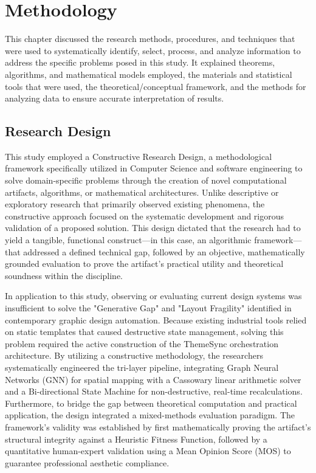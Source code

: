 
\chapter{Methodology}
\begin{refsection}
This chapter discussed the research methods, procedures, and techniques that were used to systematically identify, select, process, and analyze information to address the specific problems posed in this study. It explained theorems, algorithms, and mathematical models employed, the materials and statistical tools that were used, the theoretical/conceptual framework, and the methods for analyzing data to ensure accurate interpretation of results.


\section{Research Design}
This study employed a Constructive Research Design, a methodological framework specifically utilized in Computer Science and software engineering to solve domain-specific problems through the creation of novel computational artifacts, algorithms, or mathematical architectures. Unlike descriptive or exploratory research that primarily observed existing phenomena, the constructive approach focused on the systematic development and rigorous validation of a proposed solution. This design dictated that the research had to yield a tangible, functional construct—in this case, an algorithmic framework—that addressed a defined technical gap, followed by an objective, mathematically grounded evaluation to prove the artifact's practical utility and theoretical soundness within the discipline.

In application to this study, observing or evaluating current design systems was insufficient to solve the "Generative Gap" and "Layout Fragility" identified in contemporary graphic design automation. Because existing industrial tools relied on static templates that caused destructive state management, solving this problem required the active construction of the ThemeSync orchestration architecture. By utilizing a constructive methodology, the researchers systematically engineered the tri-layer pipeline, integrating Graph Neural Networks (GNN) for spatial mapping with a Cassowary linear arithmetic solver and a Bi-directional State Machine for non-destructive, real-time recalculations. Furthermore, to bridge the gap between theoretical computation and practical application, the design integrated a mixed-methods evaluation paradigm. The framework's validity was established by first mathematically proving the artifact's structural integrity against a Heuristic Fitness Function, followed by a quantitative human-expert validation using a Mean Opinion Score (MOS) to guarantee professional aesthetic compliance.


\end{refsection}
